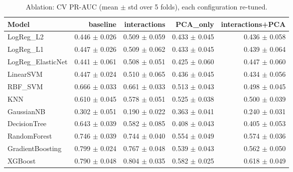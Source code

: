 \begin{table}[ht]
\centering
\small
\caption{Ablation: CV PR-AUC (mean $\pm$ std over 5 folds), each configuration re-tuned.}
\label{tab:ablation}
\begin{tabular}{lrrrr}
\toprule
Model & baseline & interactions & PCA\_only & interactions+PCA \\
\midrule
LogReg\_L2 & 0.446 $\pm$ 0.026 & 0.509 $\pm$ 0.059 & 0.433 $\pm$ 0.045 & 0.436 $\pm$ 0.058 \\
LogReg\_L1 & 0.447 $\pm$ 0.026 & 0.509 $\pm$ 0.062 & 0.433 $\pm$ 0.045 & 0.439 $\pm$ 0.064 \\
LogReg\_ElasticNet & 0.441 $\pm$ 0.061 & 0.508 $\pm$ 0.051 & 0.425 $\pm$ 0.060 & 0.447 $\pm$ 0.060 \\
LinearSVM & 0.447 $\pm$ 0.024 & 0.510 $\pm$ 0.065 & 0.436 $\pm$ 0.045 & 0.434 $\pm$ 0.056 \\
RBF\_SVM & 0.666 $\pm$ 0.033 & 0.661 $\pm$ 0.033 & 0.513 $\pm$ 0.043 & 0.498 $\pm$ 0.045 \\
KNN & 0.610 $\pm$ 0.045 & 0.578 $\pm$ 0.051 & 0.525 $\pm$ 0.038 & 0.500 $\pm$ 0.039 \\
GaussianNB & 0.302 $\pm$ 0.051 & 0.190 $\pm$ 0.022 & 0.363 $\pm$ 0.041 & 0.240 $\pm$ 0.031 \\
DecisionTree & 0.643 $\pm$ 0.039 & 0.582 $\pm$ 0.085 & 0.408 $\pm$ 0.043 & 0.405 $\pm$ 0.053 \\
RandomForest & 0.746 $\pm$ 0.039 & 0.744 $\pm$ 0.040 & 0.554 $\pm$ 0.049 & 0.574 $\pm$ 0.036 \\
GradientBoosting & 0.799 $\pm$ 0.024 & 0.767 $\pm$ 0.048 & 0.539 $\pm$ 0.043 & 0.562 $\pm$ 0.050 \\
XGBoost & 0.790 $\pm$ 0.048 & 0.804 $\pm$ 0.035 & 0.582 $\pm$ 0.025 & 0.618 $\pm$ 0.049 \\
\bottomrule
\end{tabular}
\end{table}
